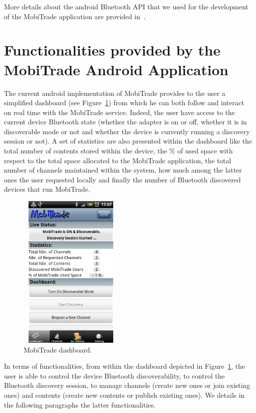 More details about the android Bluetooth API that we used for the development of the MobiTrade application are provided in~\cite{AndroidBluetoothAPI}. 

\section{Functionalities provided by the MobiTrade Android Application}
\label{MobiTradeCurrentFunctionalities}

The current android implementation of MobiTrade provides to the user a simplified dashboard (see Figure~\ref{dashboard}) from which he can both follow and interact on real time with the MobiTrade service. Indeed, the user have access to the current device Bluetooth state (whether the adapter is on or off, whether it is in discoverable mode or not and whether the device is currently running a discovery session or not). A set of statistics are also presented within the dashboard like the total number of contents stored within the device, the \% of used space with respect to the total space allocated to the MobiTrade application, the total number of channels maintained within the system, how much among the latter ones the user requested locally and finally the number of Bluetooth discovered devices that run MobiTrade.
 
\begin{figure}[!h]
\begin{center}
\includegraphics[width=2in,height=3in]{Chapitre6/Dashboard.png}
\end{center}
\caption{MobiTrade dashboard.}
\label{dashboard}
\end{figure}

In terms of functionalities, from within the dashboard depicted in Figure~\ref{dashboard}, the user is able to control the device Bluetooth discoverability, to control 
the Bluetooth discovery session, to manage channels (create new ones or join existing ones) and contents (create new contents or publish existing ones). We details in the following paragraphs the latter functionalities.

